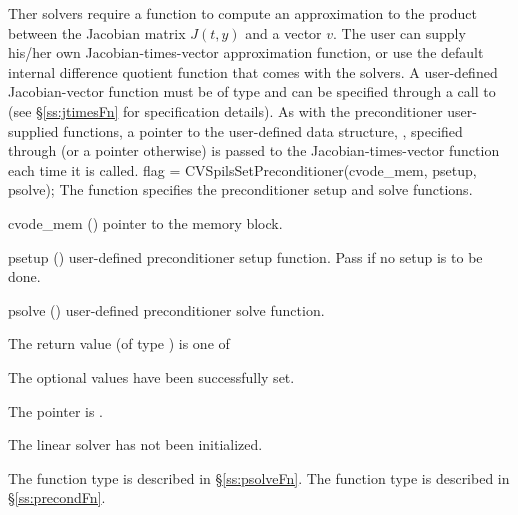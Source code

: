 Ther {\cvspils} solvers require a function to compute an approximation to the
product between the Jacobian matrix $J(t,y)$ and a vector $v$.
The user can supply his/her own Jacobian-times-vector approximation function, 
or use the default internal difference quotient function
that comes with the {\cvspils} solvers.  A user-defined Jacobian-vector
function must be of type  and 
can be specified through a call to  
(see \S\ref{ss:jtimesFn} for specification details).
As with the preconditioner user-supplied functions,
a pointer to the user-defined data structure, , specified through
 (or a  pointer otherwise) is passed to the 
Jacobian-times-vector function  each time it is called.  
{
  flag = CVSpilsSetPreconditioner(cvode\_mem, psetup, psolve);
}
{
  The function  specifies the preconditioner
  setup and solve functions.
}
{
  \begin{args}
  \item[cvode\_mem] ()
    pointer to the {\cvodes} memory block.
  \item[psetup] ()
    user-defined preconditioner setup function.
    Pass  if no setup is to be done.
  \item[psolve] ()
    user-defined preconditioner solve function.
  \end{args}
}
{
  The return value  (of type ) is one of
  \begin{args}
  \item[\Id{CVSPILS\_SUCCESS}] 
    The optional values have been successfully set.
  \item[\Id{CVSPILS\_MEM\_NULL}]
    The  pointer is .
  \item[\Id{CVSPILS\_LMEM\_NULL}]
    The {\cvspils} linear solver has not been initialized.
  \end{args}
}
{
   The function type  is described in \S\ref{ss:psolveFn}.
   The function type  is described in \S\ref{ss:precondFn}.
}
